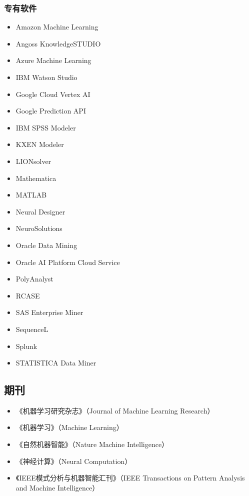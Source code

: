 \subsubsection{专有软件}  
\begin{itemize}
\item Amazon Machine Learning  
\item Angoss KnowledgeSTUDIO  
\item Azure Machine Learning  
\item IBM Watson Studio  
\item Google Cloud Vertex AI  
\item Google Prediction API  
\item IBM SPSS Modeler  
\item KXEN Modeler  
\item LIONsolver  
\item Mathematica  
\item MATLAB  
\item Neural Designer  
\item NeuroSolutions  
\item Oracle Data Mining  
\item Oracle AI Platform Cloud Service  
\item PolyAnalyst  
\item RCASE  
\item SAS Enterprise Miner  
\item SequenceL  
\item Splunk  
\item STATISTICA Data Miner
\end{itemize}
\subsection{期刊}  
\begin{itemize}
\item 《机器学习研究杂志》（Journal of Machine Learning Research）  
\item 《机器学习》（Machine Learning）  
\item 《自然机器智能》（Nature Machine Intelligence）  
\item 《神经计算》（Neural Computation）  
\item 《IEEE模式分析与机器智能汇刊》（IEEE Transactions on Pattern Analysis and Machine Intelligence）
\end{itemize}  
